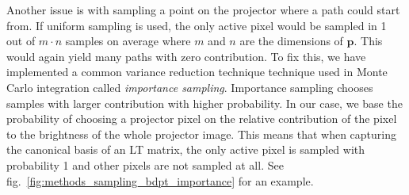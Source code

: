 Another issue is with sampling a point on the projector where a path could start from. If uniform sampling is used, the only active pixel would be sampled in 1 out of \(m \cdot n\) samples on average where \(m\) and \(n\) are the dimensions of \(\bm{p}\). This would again yield many paths with zero contribution. To fix this, we have implemented a common variance reduction technique technique used in Monte Carlo integration called \textit{importance sampling}. Importance sampling chooses samples with larger contribution with higher probability. In our case, we base the probability of choosing a projector pixel on the relative contribution of the pixel to the brightness of the whole projector image. This means that when capturing the canonical basis of an LT matrix, the only active pixel is sampled with probability 1 and other pixels are not sampled at all. See fig.~\ref{fig:methods_sampling_bdpt_importance} for an example.

